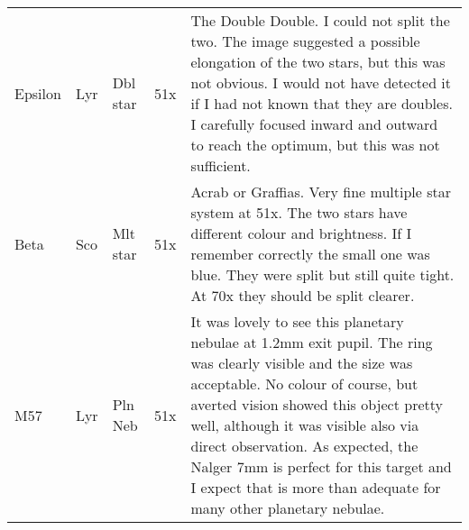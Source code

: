 \begin{longtable}{ p{0.7in}  p{0.3in}  p{0.6in}  p{0.9in}  p{5.8in} }
Epsilon & Lyr & Dbl star & 51x & The Double Double. I could not split the two. The image suggested a possible elongation of the two stars, but this was not obvious. I would not have detected it if I had not known that they are doubles. I carefully focused inward and outward to reach the optimum, but this was not sufficient.  \\ 
Beta & Sco & Mlt star & 51x & Acrab or Graffias. Very fine multiple star system at 51x. The two stars have different colour and brightness. If I remember correctly the small one was blue. They were split but still quite tight. At 70x they should be split clearer.  \\ 
M57 & Lyr & Pln Neb & 51x & It was lovely to see this planetary nebulae at 1.2mm exit pupil. The ring was clearly visible and the size was acceptable. No colour of course, but averted vision showed this object pretty well, although it was visible also via direct observation. As expected, the Nalger 7mm is perfect for this target and I expect that is more than adequate for many other planetary nebulae. \\ 
\hline 
\end{longtable} 
